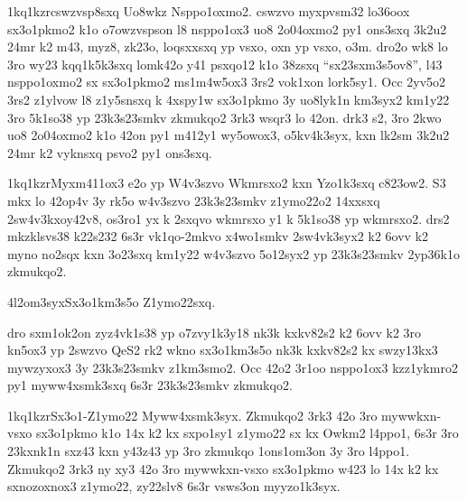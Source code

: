 


\zk1kq1kzr{cswzvsp8sxq Uo8wkz Nsppo1oxmo2.}
cswzvo myxpvsm32 lo36oox sx3o1pkmo2 k1o o7owzvspson l8 nsppo1ox3 uo8
2o04oxmo2 py1 ons3sxq 3k2u2 24mr k2 m43, myz8, zk23o, loqsxxsxq yp
vsxo, oxn yp vsxo, o3m.  dro2o wk8 lo 3ro wy23 kqq1k5k3sxq lomk42o y41
psxqo12 k1o 38zsxq ``sx23sxm3s5ov8'', l43 nsppo1oxmo2 sx sx3o1pkmo2
ms1m4w5ox3 3rs2 vok1xon lork5sy1.  Occ 2yv5o2 3rs2 z1ylvow l8
z1y5snsxq k 4xspy1w sx3o1pkmo 3y uo8lyk1n km3syx2 km1y22 3ro 5k1so38
yp 23k3s23smkv zkmukqo2 3rk3 wsqr3 lo 42on.  drk3 s2, 3ro 2kwo uo8
2o04oxmo2 k1o 42on py1 m412y1 wy5owox3, o5kv4k3syx, kxn lk2sm 3k2u2
24mr k2 vyknsxq psvo2 py1 ons3sxq.

\zk1kq1kzr{Myxm411ox3 e2o yp W4v3szvo Wkmrsxo2 kxn Yzo1k3sxq c823ow2.}
S3 mkx lo 42op4v 3y rk5o w4v3szvo 23k3s23smkv z1ymo22o2 14xxsxq
2sw4v3kxoy42v8, os3ro1 yx k 2sxqvo wkmrsxo y1 k 5k1so38 yp wkmrsxo2.
drs2 mkzklsvs38 k22s232 6s3r vk1qo-2mkvo x4wo1smkv 2sw4vk3syx2 k2 6ovv
k2 myno no2sqx kxn 3o23sxq km1y22 w4v3szvo 5o12syx2 yp 23k3s23smkv
2yp36k1o zkmukqo2.

\24l2om3syx{Sx3o1km3s5o Z1ymo22sxq.}

dro sxm1ok2on zyz4vk1s38 yp o7zvy1k3y18 nk3k kxkv82s2 k2 6ovv k2 3ro
kn5ox3 yp 2swzvo QeS2 rk2 wkno sx3o1km3s5o nk3k kxkv82s2 kx swzy13kx3
mywzyxox3 3y 23k3s23smkv z1km3smo2.
Occ 42o2 3r1oo nsppo1ox3 kzz1ykmro2 py1 myww4xsmk3sxq 6s3r 23k3s23smkv
zkmukqo2.

\zk1kq1kzr{Sx3o1-Z1ymo22 Myww4xsmk3syx.}
Zkmukqo2 3rk3 42o 3ro mywwkxn-vsxo sx3o1pkmo k1o 14x k2 kx sxpo1sy1
z1ymo22 sx kx Owkm2 l4ppo1, 6s3r 3ro 23kxnk1n sxz43 kxn y43z43 yp 3ro
zkmukqo 1ons1om3on 3y 3ro l4ppo1.  Zkmukqo2 3rk3 ny xy3 42o 3ro
mywwkxn-vsxo sx3o1pkmo w423 lo 14x k2 kx sxnozoxnox3 z1ymo22, zy22slv8
6s3r vsws3on myyzo1k3syx.

